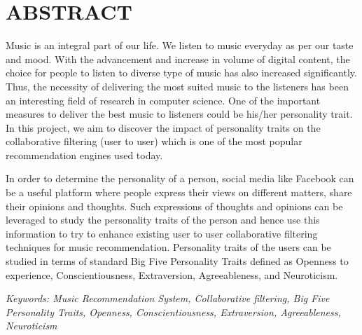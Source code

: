 


\newpage
\section*{ABSTRACT}
Music is an integral part of our life. We listen to music everyday as per our taste and mood. With the advancement and increase in volume of digital content, the choice for people to listen to diverse type of music has also increased significantly. Thus, the necessity of delivering the most suited music to the listeners has been an interesting field of research in computer science. One of the important measures to deliver the best music to listeners could be his/her personality trait. In this project, we aim to discover the impact of personality traits on the collaborative filtering (user to user) which is one of the most popular recommendation engines used today.

In order to determine the personality of a person, social media like Facebook can be a useful platform where people express their views on different matters, share their opinions and thoughts. Such expressions of thoughts and opinions can be leveraged to study the personality traits of the person and hence use this information to try to enhance existing user to user collaborative filtering techniques for music recommendation. Personality traits of the users can be studied in terms of standard Big Five Personality Traits defined as Openness to experience, Conscientiousness, Extraversion, Agreeableness, and Neuroticism.

{\em Keywords: Music Recommendation System, Collaborative filtering, Big Five Personality Traits, Openness, Conscientiousness, Extraversion, Agreeableness, Neuroticism}
